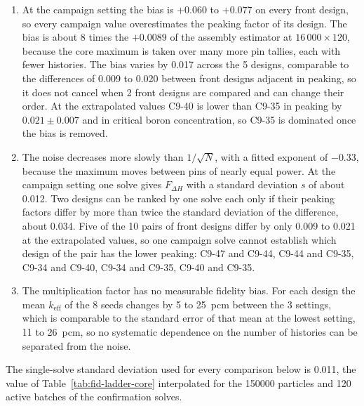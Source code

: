 \begin{enumerate}
  \item At the campaign setting the bias is $+0.060$ to $+0.077$ on every
        front design, so every campaign value overestimates the peaking
        factor of its design. The bias is about 8 times the $+0.0089$
        of the assembly estimator at $16\,000\times120$, because the
        core maximum is taken over many more pin tallies, each with
        fewer histories. The bias varies by 0.017 across the 5 designs,
        comparable to the differences of 0.009 to 0.020 between front
        designs adjacent in peaking, so it does not
        cancel when 2 front designs are compared and can change their
        order. At the extrapolated values C9-40 is lower than C9-35 in
        peaking by $0.021 \pm 0.007$ and in critical boron
        concentration, so C9-35 is dominated once the bias is removed.

  \item The noise decreases more slowly than $1/\sqrt{N}$, with a fitted
        exponent of $-0.33$, because the maximum moves between pins of
        nearly equal power. At the campaign setting one solve gives
        $F_{\Delta H}$ with a standard deviation $s$ of about 0.012. Two
        designs can be ranked by one solve each only if their peaking
        factors differ by more than twice the standard deviation of the
        difference, about 0.034. Five of the 10
        pairs of front designs differ by only 0.009 to 0.021 at the
        extrapolated values, so one campaign solve cannot establish
        which design of the pair has the lower peaking: C9-47 and C9-44,
        C9-44 and C9-35, C9-34 and C9-40, C9-34 and C9-35, C9-40 and
        C9-35.

  \item The multiplication factor has no measurable fidelity bias. For each
        design the mean $k_\mathrm{eff}$ of the 8 seeds changes by
        5 to \SI{25}{pcm} between the 3 settings, which is
        comparable to the standard error of that mean at the lowest
        setting, 11 to \SI{26}{pcm}, so no systematic dependence on the
        number of histories can be separated from the noise.
\end{enumerate}

The single-solve standard deviation used for every comparison below is
0.011, the value of Table~\ref{tab:fid-ladder-core} interpolated for
the \num{150000} particles and 120 active batches of the confirmation
solves.


